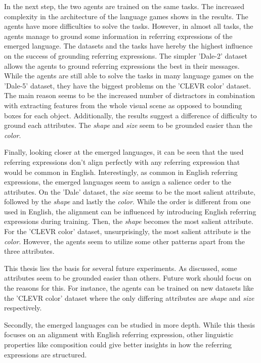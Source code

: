 In the next step, the two agents are trained on the same tasks.
The increased complexity in the architecture of the language games shows in the results.
The agents have more difficulties to solve the tasks.
However, in almost all tasks, the agents manage to ground some information in referring expressions of the emerged language.
The datasets and the tasks have hereby the highest influence on the success of grounding referring expressions.
The simpler 'Dale-2' dataset allows the agents to ground referring expressions the best in their messages.
While the agents are still able to solve the tasks in many language games on the 'Dale-5' dataset, they have the biggest problems on the 'CLEVR color' dataset.
The main reason seems to be the increased number of distractors in combination with extracting features from the whole visual scene as opposed to bounding boxes for each object.
Additionally, the results suggest a difference of difficulty to ground each attributes.
The \emph{shape} and \emph{size} seem to be grounded easier than the \emph{color}.

Finally, looking closer at the emerged languages, it can be seen that the used referring expressions don't align perfectly with any referring expression that would be common in English.
Interestingly, as common in English referring expressions, the emerged languages seem to assign a salience order to the attributes.
On the 'Dale' dataset, the \emph{size} seems to be the most salient attribute, followed by the \emph{shape} and lastly the \emph{color}.
While the order is different from one used in English, the alignment can be influenced by introducing English referring expressions during training.
Then, the \emph{shape} becomes the most salient attribute.
For the 'CLEVR color' dataset, unsurprisingly, the most salient attribute is the \emph{color}.
However, the agents seem to utilize some other patterns apart from the three attributes.

This thesis lies the basis for several future experiments.
As discussed, some attributes seem to be grounded easier than others.
Future work should focus on the reasons for this.
For instance, the agents can be trained on new datasets like the 'CLEVR color' dataset where the only differing attributes are \emph{shape} and \emph{size} respectively.

Secondly, the emerged languages can be studied in more depth.
While this thesis focuses on an alignment with English referring expression, other linguistic properties like composition could give better insights in how the referring expressions are structured.

